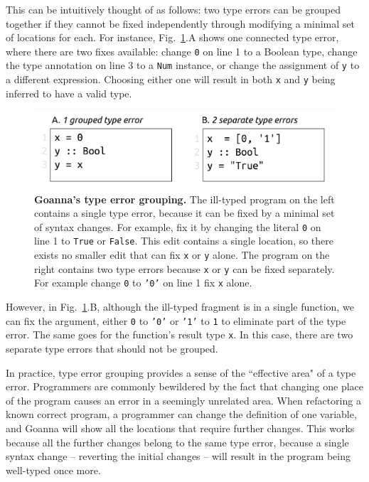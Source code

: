 \documentclass[pdflatex,lineno,sn-nature,Numbered]{sn-jnl}%
\begin{document}
    This can be intuitively thought of as follows: two type errors can be grouped together if they cannot be fixed independently through modifying a minimal set of locations for each. For instance, Fig.~\ref{fig:grouping-example}.A shows one connected type error, where there are two fixes available: change \texttt{0} on line 1 to a Boolean type, change the type annotation on line 3 to a \texttt{Num} instance, or change the assignment of \texttt{y} to a different expression. Choosing either one will result in both \texttt{x} and \texttt{y} being inferred to have a valid type.
    

   \begin{figure}[ht!]
        \centering
        \includegraphics[width=0.8\linewidth]{images/Grouping-Example}
        \caption[Goanna's type error grouping]{\textbf{Goanna's type error grouping.} The ill-typed program on the left contains a single type error, because it can be fixed by a minimal set of syntax changes. For example, fix it by changing the literal \texttt{0} on line 1 to \texttt{True} or \texttt{False}. This edit contains a single location, so there exists no smaller edit that can fix \texttt{x} or \texttt{y} alone. The program on the right contains two type errors because \texttt{x} or \texttt{y} can be fixed separately. For example change \texttt{0} to \texttt{'0'} on line 1 fix \texttt{x} alone. }
        \label{fig:grouping-example}
    \end{figure}


    However, in Fig.~\ref{fig:grouping-example}.B, although the ill-typed fragment is in a single function, we can fix the argument, either \texttt{0} to \texttt{'0'} or \texttt{'1'} to \texttt{1} to eliminate part of the type error. The same goes for the function's result type \texttt{x}. In this case, there are two separate type errors that should not be grouped.

	In practice, type error grouping provides a sense of the ``effective area" of a type error. Programmers are commonly bewildered by the fact that changing one place of the program causes an error in a seemingly unrelated area. When refactoring a known correct program, a programmer can change the definition of one variable, and Goanna will show all the locations that require further changes. This works because all the further changes belong to the same type error, because a single syntax change -- reverting the initial changes -- will result in the program being well-typed once more.
	
\end{document}
